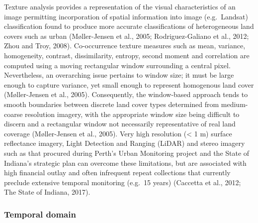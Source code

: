 \documentclass[]{book}
\begin{document}
Texture analysis provides a representation of the visual characteristics
of an image permitting incorporation of spatial information into image
(e.g.~Landsat) classification found to produce more accurate
classifications of heterogeneous land covers such as urban
(Møller-Jensen et al., 2005; Rodriguez-Galiano et al., 2012; Zhou and
Troy, 2008). Co-occurrence texture measures such as mean, variance,
homogeneity, contrast, dissimilarity, entropy, second moment and
correlation are computed using a moving rectangular window surrounding a
central pixel. Nevertheless, an overarching issue pertains to window
size; it must be large enough to capture variance, yet small enough to
represent homogenous land cover (Møller-Jensen et al., 2005).
Consequently, the window-based approach tends to smooth boundaries
between discrete land cover types determined from medium-coarse
resolution imagery, with the appropriate window size being difficult to
discern and a rectangular window not necessarily representative of real
land coverage (Møller-Jensen et al., 2005). Very high resolution
(\textless{} 1 m) surface reflectance imagery, Light Detection and
Ranging (LiDAR) and stereo imagery such as that procured during Perth's
Urban Monitoring project and the State of Indiana's strategic plan can
overcome these limitations, but are associated with high financial
outlay and often infrequent repeat collections that currently preclude
extensive temporal monitoring (e.g.~15 years) (Caccetta et al., 2012;
The State of Indiana, 2017).

\subsubsection{Temporal domain}\label{temporal-domain}
\end{document}
